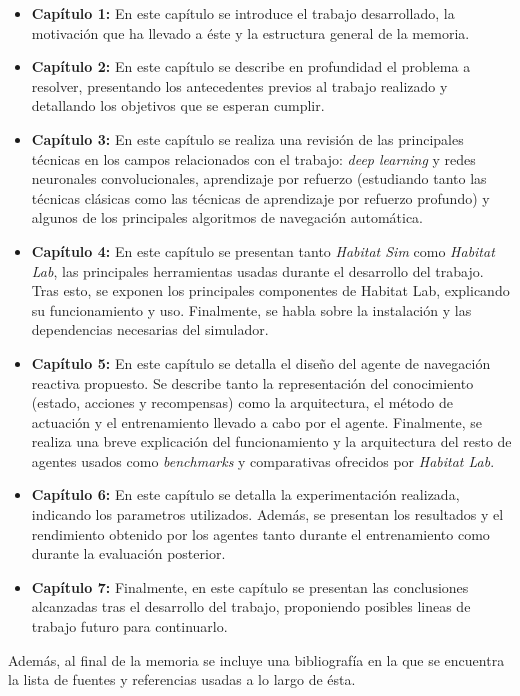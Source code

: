 \begin{itemize}
	\item \textbf{Capítulo 1:} En este capítulo se introduce el trabajo desarrollado, la motivación que ha llevado a éste y la estructura general de la memoria.
	\item \textbf{Capítulo 2:} En este capítulo se describe en profundidad el problema a resolver, presentando los antecedentes previos al trabajo realizado y detallando los objetivos que se esperan cumplir.
	\item \textbf{Capítulo 3:} En este capítulo se realiza una revisión de las principales técnicas en los campos relacionados con el trabajo: \textit{deep learning} y redes neuronales convolucionales, aprendizaje por refuerzo (estudiando tanto las técnicas clásicas como las técnicas de aprendizaje por refuerzo profundo) y algunos de los principales algoritmos de navegación automática.
	\item \textbf{Capítulo 4:} En este capítulo se presentan tanto \textit{Habitat Sim} como \textit{Habitat Lab}, las principales herramientas usadas durante el desarrollo del trabajo. Tras esto, se exponen los principales componentes de Habitat Lab, explicando su funcionamiento y uso. Finalmente, se habla sobre la instalación y las dependencias necesarias del simulador.
	\item \textbf{Capítulo 5:} En este capítulo se detalla el diseño del agente de navegación reactiva propuesto. Se describe tanto la representación del conocimiento (estado, acciones y recompensas) como la arquitectura, el método de actuación y el entrenamiento llevado a cabo por el agente. Finalmente, se realiza una breve explicación del funcionamiento y la arquitectura del resto de agentes usados como \textit{benchmarks} y comparativas ofrecidos por \textit{Habitat Lab}.
	\item \textbf{Capítulo 6:} En este capítulo se detalla la experimentación realizada, indicando los parametros utilizados. Además, se presentan los resultados y el rendimiento obtenido por los agentes tanto durante el entrenamiento como durante la evaluación posterior.
	\item \textbf{Capítulo 7:} Finalmente, en este capítulo se presentan las conclusiones alcanzadas tras el desarrollo del trabajo, proponiendo posibles lineas de trabajo futuro para continuarlo.
\end{itemize}

Además, al final de la memoria se incluye una bibliografía en la que se encuentra la lista de fuentes y referencias usadas a lo largo de ésta.

